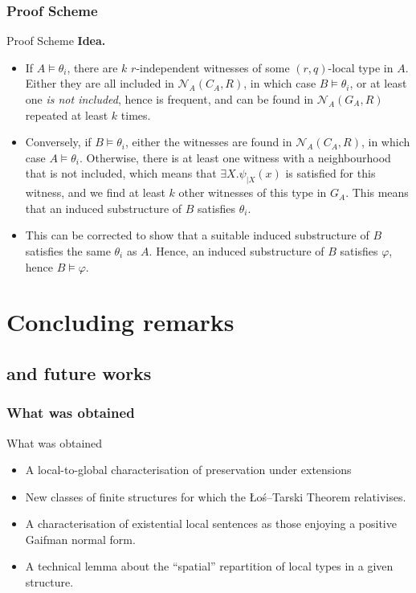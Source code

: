 \documentclass{beamer}
\newcommand{\tightlist}{}
\begin{document}
\subsubsection{Proof Scheme}\label{proof-scheme-1}

\begin{frame}{Proof Scheme}
\textbf{Idea.}

\begin{itemize}
\item
  If \(A \models \theta_i\), there are \(k\) \(r\)-independent witnesses
  of some \((r,q)\)-local type in \(A\). Either they are all included in
  \(\mathcal{N}_{A}(C_A, R)\), in which case \(B \models \theta_i\), or
  at least one \emph{is not included}, hence is frequent, and can be
  found in \(\mathcal{N}_{A}(G_A, R)\) repeated at least \(k\) times.
\item
  Conversely, if \(B \models \theta_i\), either the witnesses are found
  in \(\mathcal{N}_{A}(C_A, R)\), in which case \(A \models \theta_i\).
  Otherwise, there is at least one witness with a neighbourhood that is
  not included, which means that \(\exists X. \psi_{|X}(x)\) is
  satisfied for this witness, and we find at least \(k\) other witnesses
  of this type in \(G_A\). This means that an induced substructure of
  \(B\) satisfies \(\theta_i\).
\item
  This can be corrected to show that a suitable induced substructure of
  \(B\) satisfies the same \(\theta_i\) as \(A\). Hence, an induced
  substructure of \(B\) satisfies \(\varphi\), hence
  \(B \models \varphi\).
\end{itemize}
\end{frame}

\section{Concluding remarks}\label{concluding-remarks}

\subsection{and future works}\label{and-future-works}

\subsubsection{What was obtained}\label{what-was-obtained}

\begin{frame}{What was obtained}
\begin{itemize}
\tightlist
\item
  A local-to-global characterisation of preservation under extensions
\item
  New classes of finite structures for which the Łoś--Tarski Theorem
  relativises.
\item
  A characterisation of existential local sentences as those enjoying a
  positive Gaifman normal form.
\item
  A technical lemma about the ``spatial'' repartition of local types in
  a given structure.
\end{itemize}
\end{frame}
\end{document}
